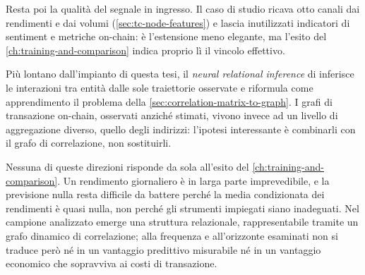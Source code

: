 Resta poi la qualità del segnale in ingresso. Il caso di studio ricava otto canali dai rendimenti e dai volumi (\cref{sec:tc-node-features}) e lascia inutilizzati indicatori di sentiment e metriche on-chain: è l'estensione meno elegante, ma l'esito del \cref{ch:training-and-comparison} indica proprio lì il vincolo effettivo.

Più lontano dall'impianto di questa tesi, il \emph{neural relational inference} di \textcite{kipf2018nri} inferisce le interazioni tra entità dalle sole traiettorie osservate e riformula come apprendimento il problema della \cref{sec:correlation-matrix-to-graph}. I grafi di transazione on-chain, osservati anziché stimati, vivono invece ad un livello di aggregazione diverso, quello degli indirizzi: l'ipotesi interessante è combinarli con il grafo di correlazione, non sostituirli.

Nessuna di queste direzioni risponde da sola all'esito del \cref{ch:training-and-comparison}. Un rendimento giornaliero è in larga parte imprevedibile, e la previsione nulla resta difficile da battere perché la media condizionata dei rendimenti è quasi nulla, non perché gli strumenti impiegati siano inadeguati. Nel campione analizzato emerge una struttura relazionale, rappresentabile tramite un grafo dinamico di correlazione; alla frequenza e all'orizzonte esaminati non si traduce però né in un vantaggio predittivo misurabile né in un vantaggio economico che sopravviva ai costi di transazione.
